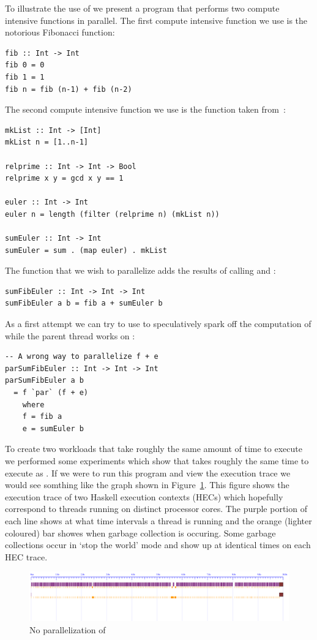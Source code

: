 To illustrate the use of  we present a program that performs two compute intensive functions in parallel. The first compute intensive function we use is the notorious Fibonacci function:
\begin{lstlisting}
fib :: Int -> Int
fib 0 = 0
fib 1 = 1
fib n = fib (n-1) + fib (n-2)
\end{lstlisting}
The second compute intensive function we use is the  function taken from~\cite{trinder:02}:
\begin{lstlisting}
mkList :: Int -> [Int]
mkList n = [1..n-1]

relprime :: Int -> Int -> Bool
relprime x y = gcd x y == 1

euler :: Int -> Int
euler n = length (filter (relprime n) (mkList n))

sumEuler :: Int -> Int
sumEuler = sum . (map euler) . mkList
\end{lstlisting}
The function that we wish to parallelize adds the results of calling  and :
\begin{lstlisting}
sumFibEuler :: Int -> Int -> Int
sumFibEuler a b = fib a + sumEuler b
\end{lstlisting}
As a first attempt we can try to use  to speculatively spark off the computation of  while the parent thread works on :
\begin{lstlisting}
-- A wrong way to parallelize f + e
parSumFibEuler :: Int -> Int -> Int
parSumFibEuler a b
  = f `par` (f + e)
    where
    f = fib a
    e = sumEuler b
\end{lstlisting}

To create two workloads that take roughly the same amount of time to execute we performed some experiments which show that  takes roughly the same time to execute as . If we were to run this program and view the execution trace we would see somthing like the graph shown in Figure~\ref{f:wrongpar}. This figure shows the execution trace of two Haskell execution contexts (HECs) which hopefully correspond to threads running on distinct processor cores. The purple portion of each line shows at what time intervals a thread is running and the orange (lighter coloured) bar showes when garbage collection is occuring. Some garbage collections occur in `stop the world' mode and show up at identical times on each HEC trace.

\begin{figure}
\begin{center}
\includegraphics[width=18cm]{SumEuler1-N2-eventlog.pdf}
\end{center}
\caption{No parallelization of }
\label{f:wrongpar}
\end{figure}

